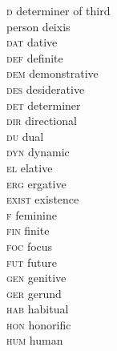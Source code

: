 \begin{refsection}
\begin{multicols}{2}
\begin{tabbing}
	\textsc{d} \>  determiner of third \\
	
	\> person deixis\\
	
	\textsc{dat} \>  dative\\
	
	\textsc{def} \>  definite\\
	
	\textsc{dem} \>  demonstrative\\
	
	\textsc{des} \>  desiderative\\
	
	\textsc{det} \>  determiner\\
	
	\textsc{dir} \>  directional\\
	
	\textsc{du} \>  dual\\
	
	\textsc{dyn} \>  dynamic\\
	
	\textsc{el} \>  elative\\
	
	\textsc{erg} \>  ergative\\
	
	\textsc{exist} \>  existence\\
	
	\textsc{f} \>  feminine\\
	
	\textsc{fin} \>  finite\\
	
	\textsc{foc} \>  focus\\
	
	\textsc{fut} \>  future\\
	
	\textsc{gen} \>  genitive\\

	
	\textsc{ger} \>  gerund\\
	
	\textsc{hab} \>  habitual\\
	
	\textsc{hon} \>  honorific\\
	
	\textsc{hum} \>  human\\
	

\end{tabbing}
\end{multicols}
\end{refsection}
